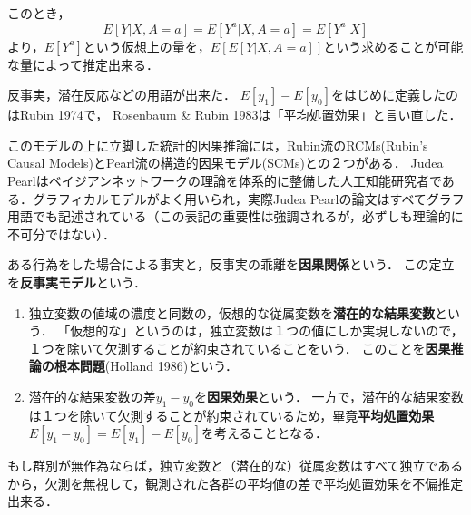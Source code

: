 \documentclass[uplatex,dvipdfmx]{jsreport}
\begin{document}
このとき，
\[E[Y|X,A=a]=E[Y^a|X,A=a]=E[Y^a|X]\]
より，$E[Y^a]$という仮想上の量を，$E[E[Y|X,A=a]]$という求めることが可能な量によって推定出来る．

\begin{tcolorbox}[colframe=ForestGreen, colback=ForestGreen!10!white,breakable,colbacktitle=ForestGreen!40!white,coltitle=black,fonttitle=\bfseries\sffamily,
    title=]
    反事実，潜在反応などの用語が出来た．
    $E[y_1]-E[y_0]$をはじめに定義したのはRubin 1974で，
    Rosenbaum \& Rubin 1983は「平均処置効果」と言い直した．

    このモデルの上に立脚した統計的因果推論には，Rubin流のRCMs(Rubin's Causal Models)とPearl流の構造的因果モデル(SCMs)との２つがある．
    Judea Pearlはベイジアンネットワークの理論を体系的に整備した人工知能研究者である．グラフィカルモデルがよく用いられ，実際Judea Pearlの論文はすべてグラフ用語でも記述されている（この表記の重要性は強調されるが，必ずしも理論的に不可分ではない）．
\end{tcolorbox}

\begin{axiom}
    ある行為をした場合による事実と，反事実の乖離を\textbf{因果関係}という．
    この定立を\textbf{反事実モデル}という．
\end{axiom}

\begin{definition}\mbox{}
    \begin{enumerate}
        \item 独立変数の値域の濃度と同数の，仮想的な従属変数を\textbf{潜在的な結果変数}という．
        「仮想的な」というのは，独立変数は１つの値にしか実現しないので，１つを除いて欠測することが約束されていることをいう．
        このことを\textbf{因果推論の根本問題}(Holland 1986)という．
        \item 潜在的な結果変数の差$y_1-y_0$を\textbf{因果効果}という．
        一方で，潜在的な結果変数は１つを除いて欠測することが約束されているため，畢竟\textbf{平均処置効果}$E[y_1-y_0]=E[y_1]-E[y_0]$を考えることとなる．
    \end{enumerate}
\end{definition}
\begin{remark}
    もし群別が無作為ならば，独立変数と（潜在的な）従属変数はすべて独立であるから，欠測を無視して，観測された各群の平均値の差で平均処置効果を不偏推定出来る．
\end{remark}
\end{document}
